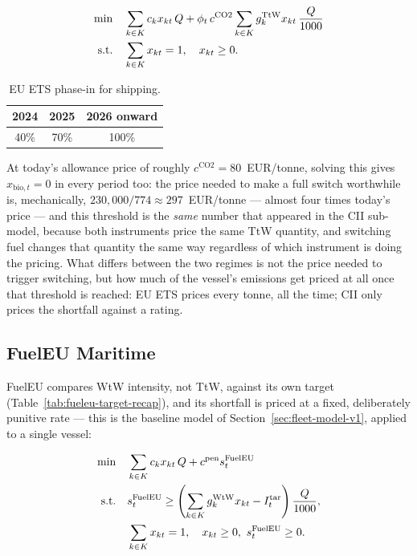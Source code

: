 \begin{align}
  \min \quad & \sum_{k\in K}c_kx_{kt}\,Q + \phi_t\,c^{\text{CO2}}\sum_{k\in K}g_k^{\text{TtW}}x_{kt}\,\frac{Q}{1000} \notag\\
  \text{s.t.} \quad & \sum_{k\in K}x_{kt}=1, \quad x_{kt}\geq0. \notag
\end{align}

\begin{table}[htbp]
\centering
\caption{EU ETS phase-in for shipping.}
\label{tab:ets-phasein}
\begin{tabular}{@{}ccc@{}}
\toprule
2024 & 2025 & 2026 onward \\
\midrule
40\% & 70\% & 100\% \\
\bottomrule
\end{tabular}
\end{table}

At today's allowance price of roughly $c^{\text{CO2}}=80$~EUR/tonne,
solving this gives $x_{\text{bio},t}=0$ in every period too: the price
needed to make a full switch worthwhile is, mechanically,
$230{,}000/774\approx297$~EUR/tonne --- almost four times today's price
--- and this threshold is the \emph{same} number that appeared in the
CII sub-model, because both instruments price the same TtW quantity, and
switching fuel changes that quantity the same way regardless of which
instrument is doing the pricing. What differs between the two regimes is
not the price needed to trigger switching, but how much of the vessel's
emissions get priced at all once that threshold is reached: EU ETS
prices every tonne, all the time; CII only prices the shortfall against
a rating.

\subsection{FuelEU Maritime}
\label{sec:regimes-fueleu}

FuelEU compares WtW intensity, not TtW, against its own target
(Table~\ref{tab:fueleu-target-recap}), and its shortfall is priced at a
fixed, deliberately punitive rate --- this is the baseline model of
Section~\ref{sec:fleet-model-v1}, applied to a single vessel:

\begin{align}
  \min \quad & \sum_{k\in K}c_kx_{kt}\,Q + c^{\text{pen}}s_t^{\text{FuelEU}} \notag\\
  \text{s.t.} \quad & s_t^{\text{FuelEU}} \geq \left(\sum_{k\in K}g_k^{\text{WtW}}x_{kt} - I_t^{\text{tar}}\right)\frac{Q}{1000}, \notag\\
  & \sum_{k\in K}x_{kt}=1, \quad x_{kt}\geq0,\ s_t^{\text{FuelEU}}\geq0. \notag
\end{align}


